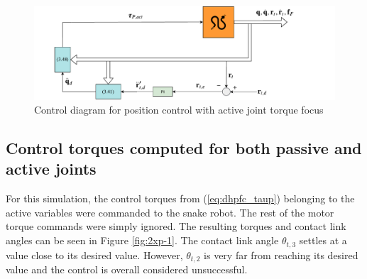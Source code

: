 \begin{figure}
    \centering
    \includegraphics[trim=1cm 0cm 3cm 0cm, clip=true, width=\textwidth]{figures/experiments/control-diagrams/2p-control-diagram.pdf}
    \caption{Control diagram for position control with active joint torque focus}
    \label{fig:diag-2p}
\end{figure}

\subsection{Control torques computed for both passive and active joints}

For this simulation, the control torques from (\ref{eq:dhpfc_taup}) belonging to the active variables were commanded to the snake robot. The rest of the motor torque commands were simply ignored. The resulting torques and contact link angles can be seen in Figure \ref{fig:2xp-1}. The contact link angle $\theta_{t,3}$ settles at a value close to its desired value. However, $\theta_{t,2}$ is very far from reaching its desired value and the control is overall considered unsuccessful.

